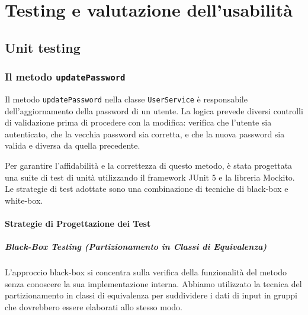 \chapter{Testing e valutazione dell'usabilità}
\section{Unit testing}
\subsection{Il metodo \texttt{updatePassword}}
Il metodo \texttt{updatePassword} nella classe \texttt{UserService} è responsabile dell'aggiornamento della password di un utente. La logica prevede diversi controlli di validazione prima di procedere con la modifica: verifica che l'utente sia autenticato, che la vecchia password sia corretta, e che la nuova password sia valida e diversa da quella precedente.

Per garantire l'affidabilità e la correttezza di questo metodo, è stata progettata una suite di test di unità utilizzando il framework JUnit 5 e la libreria Mockito. Le strategie di test adottate sono una combinazione di tecniche di black-box e white-box.

\subsubsection{Strategie di Progettazione dei Test}

\paragraph{Black-Box Testing (Partizionamento in Classi di Equivalenza)}
L'approccio black-box si concentra sulla verifica della funzionalità del metodo senza conoscere la sua implementazione interna. Abbiamo utilizzato la tecnica del partizionamento in classi di equivalenza per suddividere i dati di input in gruppi che dovrebbero essere elaborati allo stesso modo.

